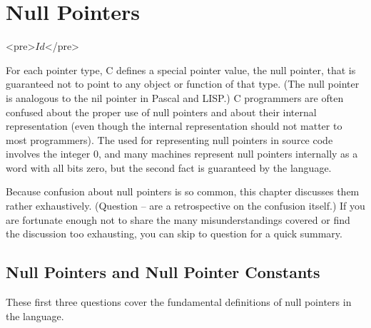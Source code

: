 \chapter{Null Pointers}	\label{chap:nullptr}

\begin{rawhtml}
<pre>$Id$</pre>
\end{rawhtml}

For each pointer type, C defines a special pointer value, the null pointer,
that is guaranteed not to point to any object or function of that type. (The
null pointer is analogous to the nil pointer in Pascal and LISP.)
C programmers are often confused about the proper use of null pointers and
about their internal representation (even though the internal representation
should not matter to most programmers). The  used for
representing null pointers in source code involves the integer 0, and many
machines represent null pointers internally as a word with all bits zero, but
the second fact is  guaranteed by the language.

Because confusion about null pointers is so common, this chapter discusses them
rather exhaustively. (Question -- are a retrospective on the confusion
itself.) If you are fortunate enough not to share the many misunderstandings
covered or find the discussion too exhausting, you can skip to question 
for a quick summary.

\section{Null Pointers and Null Pointer Constants}
These first three questions cover the fundamental definitions of null pointers
in the language.

